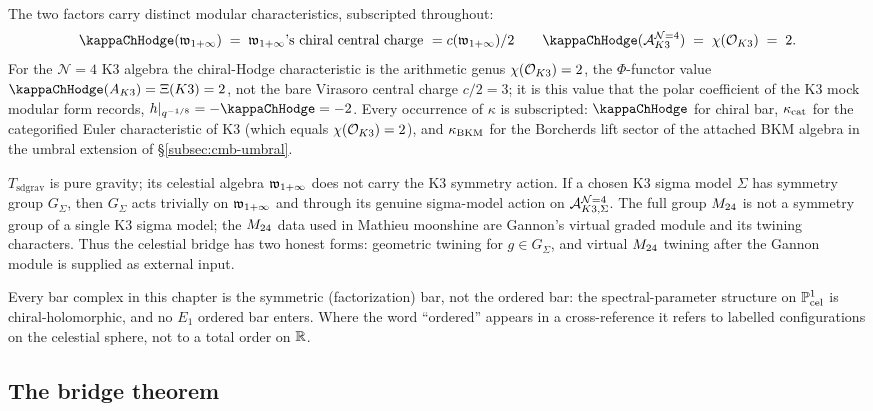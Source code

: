 \begin{remark}
\label{rem:cmb-two-kappa}
The two factors carry distinct modular characteristics, subscripted throughout:
\[
\kapch(\wtc) \;=\; \wtc\text{'s chiral central charge }
 = c(\wtc) / 2 \qquad
\kapch(\cA^{\mathcal{N}{=}4}_{K3}) \;=\; \chi(\cO_{K3}) \;=\; 2.
\]
For the $\mathcal{N}{=}4$ K3 algebra the chiral-Hodge characteristic is
the arithmetic genus $\chi(\mathcal O_{K3}) = 2$, the $\Phi$-functor value
$\kapch(A_{K3}) = \Xi(K3) = 2$, not the bare Virasoro central charge
$c/2 = 3$; it is this value that the polar coefficient of the K3 mock
modular form records, $h|_{q^{-1/8}} = -\kapch = -2$.
Every occurrence of $\kappa$ is subscripted: $\kapch$ for chiral bar,
$\kappa_{\mathrm{cat}}$ for the categorified Euler
characteristic of K3 (which equals $\chi(\mathcal O_{K3}) = 2$), and
$\kappa_{\mathrm{BKM}}$ for the Borcherds lift sector of the attached BKM
algebra in the umbral extension of
\S\ref{subsec:cmb-umbral}.
\end{remark}

\begin{remark}
\label{rem:cmb-gravity-m24-invariant}
$T_{\mathrm{sd grav}}$ is pure gravity; its celestial algebra $\mathfrak w_{1+\infty}$
does not carry the K3 symmetry action. If a chosen K3 sigma model
$\Sigma$ has symmetry group $G_\Sigma$, then $G_\Sigma$ acts trivially
on $\mathfrak w_{1+\infty}$ and through its genuine sigma-model action on
\(\mathcal A^{\mathcal{N}{=}4}_{K3,\Sigma}\). The full group $M_{24}$ is
not a symmetry group of a single K3 sigma model; the $M_{24}$ data
used in Mathieu moonshine are Gannon's virtual graded module and its
twining characters. Thus the celestial bridge has two honest forms:
geometric twining for \(g\in G_\Sigma\), and virtual $M_{24}$
twining after the Gannon module is supplied as external input.
\end{remark}

\begin{remark}
\label{rem:cmb-no-ordering}
Every bar complex in this chapter is the symmetric (factorization) bar,
not the ordered bar: the spectral-parameter structure on $\mathbb P^1_{\mathrm{cel}}$
is chiral-holomorphic, and no $E_1$
ordered bar enters. Where the word ``ordered'' appears in a cross-reference
it refers to labelled configurations on the celestial sphere,
not to a total order on $\mathbb R$.
\end{remark}

\subsection{The bridge theorem}
\label{subsec:cmb-main}

